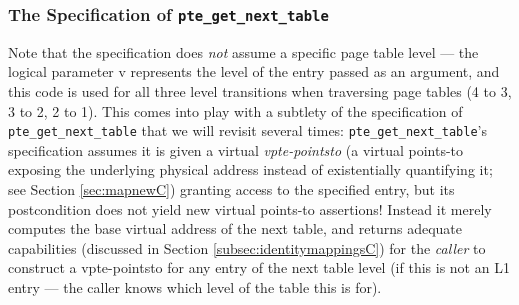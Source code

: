 

\subsubsection{The Specification of \lstinline|pte_get_next_table|}
Note that the specification does \emph{not} assume a specific page table level --- the logical parameter \textsf{v} represents the level
of the entry passed as an argument, and this code
is used for all three level transitions when traversing page tables (4 to 3, 3 to 2, 2 to 1).
This comes into play with a subtlety of the specification of \lstinline|pte_get_next_table| that we will
revisit several times: \lstinline|pte_get_next_table|'s specification
assumes it is given a virtual \emph{vpte-pointsto}
(a virtual points-to exposing the underlying physical address instead of existentially quantifying it;
 see Section \ref{sec:mapnewC}) granting access to the specified entry,
but its postcondition does not yield new virtual points-to assertions!
Instead it merely computes the base virtual address of the next table, and returns adequate capabilities (discussed in Section \ref{subsec:identitymappingsC})
for the \emph{caller} to construct a vpte-pointsto for any entry of the next table level (if this is not an L1 entry ---
the caller knows which level of the table this is for).


